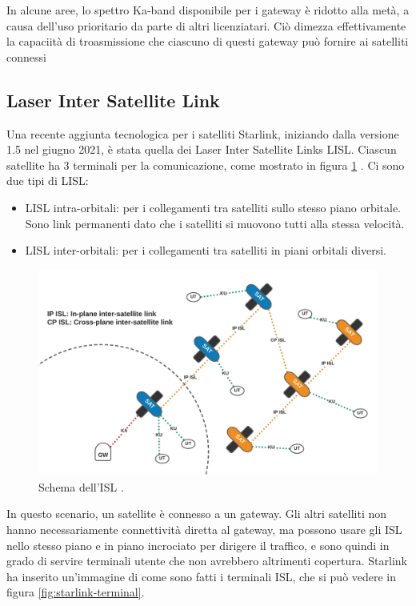 In alcune aree, lo spettro \ac{Ka}-band disponibile per i gateway è ridotto alla metà, a causa dell'uso prioritario da parte di altri licenziatari. Ciò dimezza effettivamente la capaciità di troasmissione che ciascuno di questi gateway può fornire ai satelliti connessi \cite{mike_puchol_modeling_2022}

\subsection{Laser Inter Satellite Link}

Una recente aggiunta tecnologica per i satelliti Starlink, iniziando dalla versione 1.5 nel giugno 2021, è stata quella dei Laser Inter Satellite Links \ac{LISL}.
Ciascun satellite ha 3 terminali per la comunicazione, come mostrato in figura \ref{fig:starlink-ISL} \cite{mike_puchol_modeling_2022} \cite{chaudhry_laser_2021}.
Ci sono due tipi di \ac{LISL}:
\begin{itemize}
  \item \ac{LISL} intra-orbitali: per i collegamenti tra satelliti sullo stesso piano orbitale. Sono link permanenti dato che i satelliti si muovono tutti alla stessa velocità.
  \item \ac{LISL} inter-orbitali: per i collegamenti tra satelliti in piani orbitali diversi.
\end{itemize}

\begin{figure}[htbp]
  \centering
  \includegraphics[width=0.9\linewidth]{./res/img/LISL_scheme.png}
  \caption{Schema dell'\ac{ISL} \cite{mike_puchol_modeling_2022}.}
  \label{fig:starlink-ISL}
\end{figure}

In questo scenario, un satellite è connesso a un gateway.
Gli altri satelliti non hanno necessariamente connettività diretta al gateway, ma possono usare gli \ac{ISL} nello stesso piano e in piano incrociato per dirigere il traffico, e sono quindi in grado di servire terminali utente che non avrebbero altrimenti copertura.
Starlink ha inserito un'immagine di come sono fatti i terminali \ac{ISL}, che si può vedere in figura \ref{fig:starlink-terminal}.

